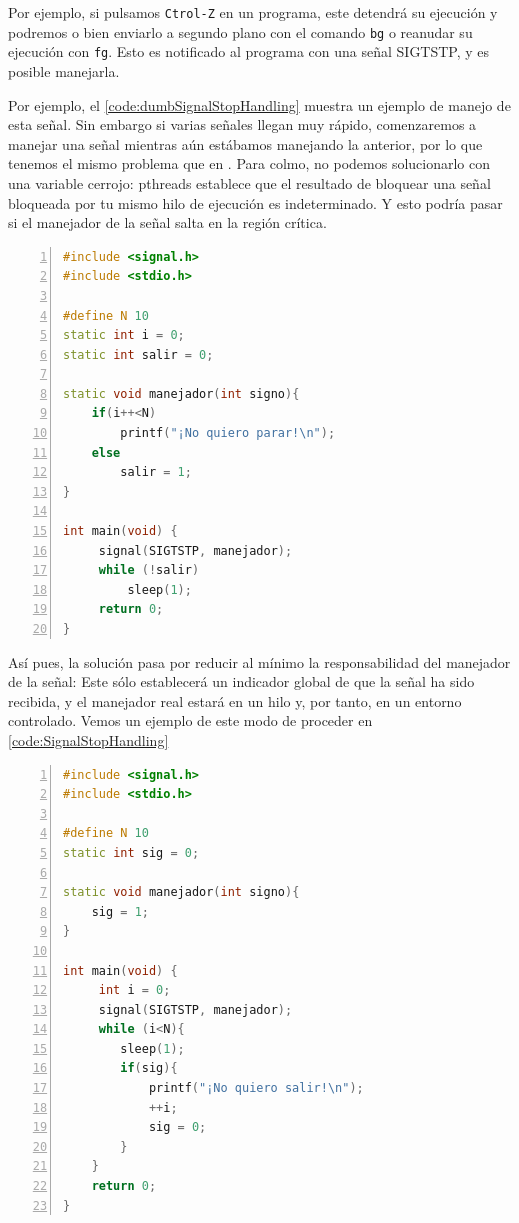 Por ejemplo, si pulsamos \texttt{Ctrol-Z} en un programa, este detendrá su ejecución y podremos o bien enviarlo a 
segundo plano con el comando \texttt{bg} o reanudar su ejecución con \texttt{fg}. Esto es notificado al programa con 
una señal \gls{SIGTSTP}, y es posible manejarla.

Por ejemplo, el \lstlistingname{} \ref{code:dumbSignalStopHandling} muestra un ejemplo de manejo de esta señal. Sin 
embargo si varias señales llegan muy rápido, comenzaremos a manejar una señal mientras aún estábamos manejando la 
anterior, por lo que tenemos el mismo problema que en . Para colmo, no podemos solucionarlo 
con una variable cerrojo: \gls{pthreads} establece que el resultado de bloquear una señal 
bloqueada por tu mismo hilo de ejecución es indeterminado. Y esto podría pasar si el manejador de la señal salta en la 
región crítica.

\begin{lstlisting}[language=C++,caption={Manejo ingenuo de la señal \gls{SIGTSTP}}, 
breaklines=true, label=code:dumbSignalStopHandling,numbers=left,float=htbp]
#include <signal.h>
#include <stdio.h>

#define N 10
static int i = 0;
static int salir = 0;

static void manejador(int signo){
    if(i++<N)
        printf("¡No quiero parar!\n");
    else
        salir = 1;
}

int main(void) {
     signal(SIGTSTP, manejador);
     while (!salir)
         sleep(1);
     return 0;
}
\end{lstlisting}

Así pues, la solución pasa por reducir al mínimo la responsabilidad del manejador de la señal: Este sólo establecerá un 
indicador global de que la señal ha sido recibida, y el manejador real estará en un hilo y, por tanto, en un entorno 
controlado. Vemos un ejemplo de este modo de proceder en \lstlistingname{} \ref{code:SignalStopHandling}

\begin{lstlisting}[language=C++,caption={Manejo de la señal \gls{SIGTSTP}}, 
breaklines=true, label=code:SignalStopHandling,numbers=left,float=htbp]
#include <signal.h>
#include <stdio.h>

#define N 10
static int sig = 0;

static void manejador(int signo){
    sig = 1;
}

int main(void) {
     int i = 0;
     signal(SIGTSTP, manejador);
     while (i<N){
        sleep(1);
        if(sig){
            printf("¡No quiero salir!\n");
            ++i;
            sig = 0;
        }
    }
    return 0;
}
\end{lstlisting}

